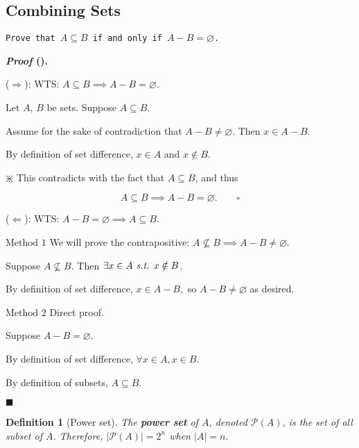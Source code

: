 \documentclass[12pt,a4paper]{article}
\newtheorem{df}{Definition}[subsection]
\newcounter{nprf}[subsection]
\newenvironment*{prf}{\par\indent\textbf{\textit{Proof} (\stepcounter{nprf}\thenprf). }\par}{\par\hfill $\blacksquare$\par}
\def\pow{{\mathcal{P}}}
\def\emptyset{\varnothing}
\def\st{\emph{ s.t. }}
\begin{document}
\subsection{Combining Sets}
\begin{framed}
\noindent\texttt{Prove that $A\subseteq B$ if and only if $A-B=\emptyset$.}
\begin{prf}
	($\Rightarrow$): WTS: $A\subseteq B\implies A-B=\emptyset$.\par\hspace{5mm}Let $A$, $B$ be sets. Suppose $A\subseteq B.$\par\hspace{5mm}Assume for the sake of contradiction that $A-B\neq\emptyset$. Then $x\in A-B$.\par\hspace{5mm}By definition of set difference, $x\in A$ and $x\notin B$.\par\begin{center}$\divideontimes$ This contradicts with the fact that $A\subseteq B$, and thus \end{center}\[A\subseteq B\implies A-B=\emptyset.\qquad\square\]\par
	($\Leftarrow$): WTS: $A-B=\emptyset\implies A\subseteq B.$\par\hspace{5mm}$\boxed{\text{Method }1}$ We will prove the contrapositive: $A\nsubseteq B\implies A-B\neq\emptyset$.\par\hspace{5mm}Suppose $A\nsubseteq B$. Then $\exists x\in A \st x\notin B$.\par\hspace{5mm}By definition of set difference, $x\in A-B,$ so $A-B\neq\emptyset$ as desired.\par\hspace{5mm}$\boxed{\text{Method }2}$ Direct proof.\par\hspace{5mm}Suppose $A-B=\emptyset$.\par\hspace{5mm}By definition of set difference, $\forall x\in A, x\in B.$\par\hspace{5mm}By definition of subsets, $A\subseteq B.$
\end{prf}	
\end{framed}
\begin{df}[Power set]
	The \textbf{power set} of $A$, denoted $\pow(A)$, is the set of all subset of $A$. Therefore, $|\pow(A)|=2^n$ when $|A|=n.$
\end{df}
\end{document}

